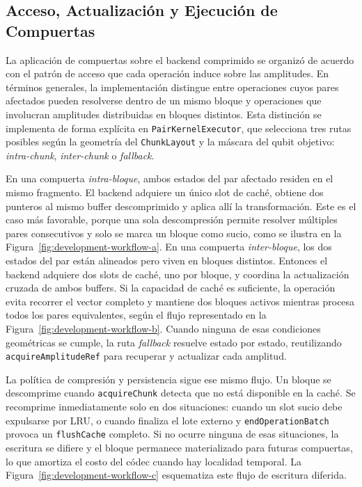 \subsection{Acceso, Actualización y Ejecución de Compuertas}

La aplicación de compuertas sobre el backend comprimido se organizó de acuerdo con el
patrón de acceso que cada operación induce sobre las amplitudes. En términos
generales, la implementación distingue entre operaciones cuyos pares afectados pueden
resolverse dentro de un mismo bloque y operaciones que involucran amplitudes
distribuidas en bloques distintos. Esta distinción se implementa de forma explícita en
\texttt{PairKernelExecutor}, que selecciona tres rutas posibles según la geometría del
\texttt{ChunkLayout} y la máscara del qubit objetivo: \textit{intra-chunk},
\textit{inter-chunk} o \textit{fallback}.

En una compuerta \textit{intra-bloque}, ambos estados del par afectado residen en el mismo
fragmento. El backend adquiere un único slot de caché, obtiene dos punteros al mismo
buffer descomprimido y aplica allí la transformación. Este es el caso más favorable,
porque una sola descompresión permite resolver múltiples pares consecutivos y solo se
marca un bloque como sucio, como se ilustra en la Figura~\ref{fig:development-workflow-a}. En una compuerta \textit{inter-bloque}, los dos estados del par
están alineados pero viven en bloques distintos. Entonces el backend adquiere dos slots de
caché, uno por bloque, y coordina la actualización cruzada de ambos buffers. Si la
capacidad de caché es suficiente, la operación evita recorrer el vector completo y mantiene
dos bloques activos mientras procesa todos los pares equivalentes, según el flujo representado en la Figura~\ref{fig:development-workflow-b}. Cuando ninguna de esas
condiciones geométricas se cumple, la ruta \textit{fallback} resuelve estado por estado,
reutilizando \texttt{acquireAmplitudeRef} para recuperar y actualizar cada amplitud.

La política de compresión y persistencia sigue ese mismo flujo. Un bloque se descomprime
cuando \texttt{acquireChunk} detecta que no está disponible en la caché. Se recomprime
inmediatamente solo en dos situaciones: cuando un slot sucio debe expulsarse por LRU, o
cuando finaliza el lote externo y \texttt{endOperationBatch} provoca un \texttt{flushCache}
completo. Si no ocurre ninguna de esas situaciones, la escritura se difiere y el bloque
permanece materializado para futuras compuertas, lo que amortiza el costo del códec
cuando hay localidad temporal. La Figura~\ref{fig:development-workflow-c} esquematiza este flujo de escritura diferida.

